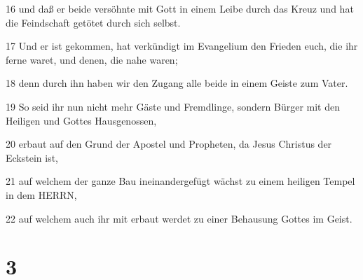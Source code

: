 \par 16 und daß er beide versöhnte mit Gott in einem Leibe durch das Kreuz und hat die Feindschaft getötet durch sich selbst.
\par 17 Und er ist gekommen, hat verkündigt im Evangelium den Frieden euch, die ihr ferne waret, und denen, die nahe waren;
\par 18 denn durch ihn haben wir den Zugang alle beide in einem Geiste zum Vater.
\par 19 So seid ihr nun nicht mehr Gäste und Fremdlinge, sondern Bürger mit den Heiligen und Gottes Hausgenossen,
\par 20 erbaut auf den Grund der Apostel und Propheten, da Jesus Christus der Eckstein ist,
\par 21 auf welchem der ganze Bau ineinandergefügt wächst zu einem heiligen Tempel in dem HERRN,
\par 22 auf welchem auch ihr mit erbaut werdet zu einer Behausung Gottes im Geist.

\chapter{3}

